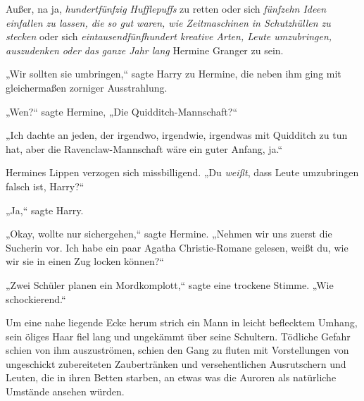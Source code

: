 Außer, na ja, \emph{hundertfünfzig Hufflepuffs} zu retten oder sich \emph{fünfzehn Ideen einfallen zu lassen, die so gut waren, wie Zeitmaschinen in Schutzhüllen zu stecken} oder sich \emph{eintausendfünfhundert kreative Arten, Leute umzubringen, auszudenken oder das} \emph{ganze Jahr lang} Hermine Granger zu sein.

„Wir sollten sie umbringen,“ sagte Harry zu Hermine, die neben ihm ging mit gleichermaßen zorniger Ausstrahlung.

„Wen?“ sagte Hermine, „Die Quidditch-Mannschaft?“

„Ich dachte an jeden, der irgendwo, irgendwie, irgendwas mit Quidditch zu tun hat, aber die Ravenclaw-Mannschaft wäre ein guter Anfang, ja.“

Hermines Lippen verzogen sich missbilligend. „Du \emph{weißt}, dass Leute umzubringen falsch ist, Harry?“

„Ja,“ sagte Harry.

„Okay, wollte nur sichergehen,“ sagte Hermine. „Nehmen wir uns zuerst die Sucherin vor. Ich habe ein paar Agatha Christie-Romane gelesen, weißt du, wie wir sie in einen Zug locken können?“

„Zwei Schüler planen ein Mordkomplott,“ sagte eine trockene Stimme. „Wie schockierend.“

Um eine nahe liegende Ecke herum strich ein Mann in leicht beflecktem Umhang, sein öliges Haar fiel lang und ungekämmt über seine Schultern. Tödliche Gefahr schien von ihm auszuströmen, schien den Gang zu fluten mit Vorstellungen von ungeschickt zubereiteten Zaubertränken und versehentlichen Ausrutschern und Leuten, die in ihren Betten starben, an etwas was die Auroren als natürliche Umstände ansehen würden.

